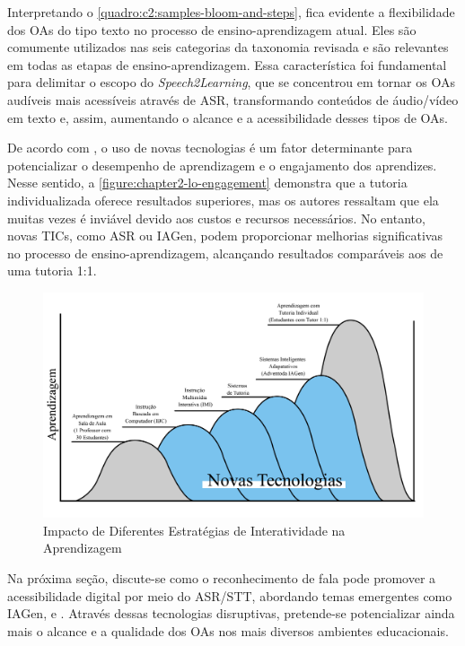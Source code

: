 Interpretando o \autoref{quadro:c2:samples-bloom-and-steps}, fica evidente a flexibilidade dos OAs do tipo texto no processo de ensino-aprendizagem atual. Eles são comumente utilizados nas seis categorias da taxonomia revisada e são relevantes em todas as etapas de ensino-aprendizagem. Essa característica foi fundamental para delimitar o escopo do \textit{Speech2Learning}, que se concentrou em tornar os OAs audíveis mais acessíveis através de ASR, transformando conteúdos de áudio/vídeo em texto e, assim, aumentando o alcance e a acessibilidade desses tipos de OAs.

De acordo com , o uso de novas tecnologias é um fator determinante para potencializar o desempenho de aprendizagem e o engajamento dos aprendizes. Nesse sentido, a \autoref{figure:chapter2-lo-engagement} demonstra que a tutoria individualizada oferece resultados superiores, mas os autores ressaltam que ela muitas vezes é inviável devido aos custos e recursos necessários. No entanto, novas TICs, como ASR ou IAGen, podem proporcionar melhorias significativas no processo de ensino-aprendizagem, alcançando resultados comparáveis aos de uma tutoria 1:1.

\begin{figure}[htb]
\centering
\caption{Impacto de Diferentes Estratégias de Interatividade na Aprendizagem}
\label{figure:chapter2-lo-engagement}
\includegraphics[width=1\textwidth]{images/chapter2-lo-engagement.jpg}
\end{figure}

Na próxima seção, discute-se como o reconhecimento de fala pode promover a acessibilidade digital por meio do ASR/STT, abordando temas emergentes como IAGen,  e . Através dessas tecnologias disruptivas, pretende-se potencializar ainda mais o alcance e a qualidade dos OAs nos mais diversos ambientes educacionais.

